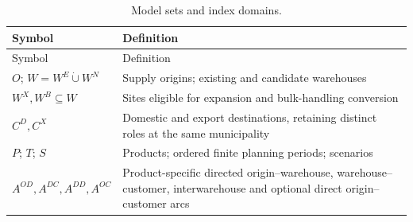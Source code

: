 \documentclass[
  english,
  11pt,
  a4paper,
  authoryear,
  preprint]{elsarticle}
\begin{document}
\begin{longtable}[]{@{}
  >{\raggedright\arraybackslash}p{}
  >{\raggedright\arraybackslash}p{}@{}}
\caption{Model sets and index domains.}\label{tbl-sets}\tabularnewline
\toprule\noalign{}
\begin{minipage}[b]{\linewidth}\raggedright
Symbol
\end{minipage} & \begin{minipage}[b]{\linewidth}\raggedright
Definition
\end{minipage} \\
\midrule\noalign{}
\endfirsthead
\toprule\noalign{}
\begin{minipage}[b]{\linewidth}\raggedright
Symbol
\end{minipage} & \begin{minipage}[b]{\linewidth}\raggedright
Definition
\end{minipage} \\
\midrule\noalign{}
\endhead
\bottomrule\noalign{}
\endlastfoot
\(O\); \(W=W^E\mathbin{\dot\cup}W^N\) & Supply origins; existing and
candidate warehouses \\
\(W^X,W^B\subseteq W\) & Sites eligible for expansion and bulk-handling
conversion \\
\(C^D,C^X\) & Domestic and export destinations, retaining distinct roles
at the same municipality \\
\(P\); \(T\); \(S\) & Products; ordered finite planning periods;
scenarios \\
\(A^{OD},A^{DC},A^{DD},A^{OC}\) & Product-specific directed
origin--warehouse, warehouse--customer, interwarehouse and optional
direct origin--customer arcs \\
\end{longtable}
\end{document}
